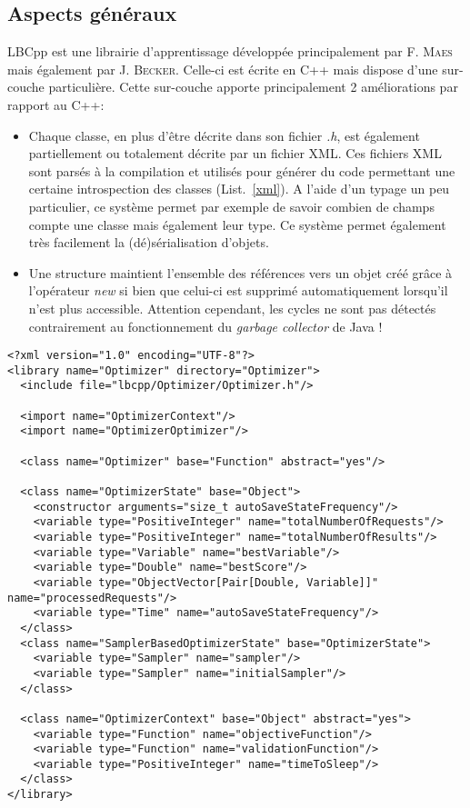 \documentclass[a4paper, 12pt]{report}
\begin{document}
\subsection{Aspects généraux}
LBCpp est une librairie d'apprentissage développée principalement par F. \textsc{Maes} mais également par J. \textsc{Becker}. Celle-ci est écrite en C++ mais dispose d'une sur-couche particulière. Cette sur-couche apporte principalement 2 améliorations par rapport au C++:
\begin{itemize}
\item Chaque classe, en plus d'être décrite dans son fichier \textit{.h}, est également partiellement ou totalement décrite par un fichier XML. Ces fichiers XML sont parsés à la compilation et utilisés pour générer du code permettant une certaine introspection des classes (List.~\ref{xml}). A l'aide d'un typage un peu particulier, ce système permet par exemple de savoir combien de champs compte une classe mais également leur type. Ce système permet également très facilement la (dé)sérialisation d'objets.
\item Une structure maintient l'ensemble des références vers un objet créé grâce à l'opérateur \textit{new} si bien que celui-ci est supprimé automatiquement lorsqu'il n'est plus accessible. Attention cependant, les cycles ne sont pas détectés contrairement au fonctionnement du \textit{garbage collector} de Java !
\end{itemize}
\newpage
{}
\begin{lstlisting}
<?xml version="1.0" encoding="UTF-8"?>
<library name="Optimizer" directory="Optimizer">
  <include file="lbcpp/Optimizer/Optimizer.h"/>

  <import name="OptimizerContext"/>
  <import name="OptimizerOptimizer"/>

  <class name="Optimizer" base="Function" abstract="yes"/>
  
  <class name="OptimizerState" base="Object">
    <constructor arguments="size_t autoSaveStateFrequency"/>
    <variable type="PositiveInteger" name="totalNumberOfRequests"/>
    <variable type="PositiveInteger" name="totalNumberOfResults"/>
    <variable type="Variable" name="bestVariable"/>
    <variable type="Double" name="bestScore"/>
    <variable type="ObjectVector[Pair[Double, Variable]]" name="processedRequests"/>
    <variable type="Time" name="autoSaveStateFrequency"/>
  </class>
  <class name="SamplerBasedOptimizerState" base="OptimizerState">
    <variable type="Sampler" name="sampler"/>
    <variable type="Sampler" name="initialSampler"/>
  </class>

  <class name="OptimizerContext" base="Object" abstract="yes">
    <variable type="Function" name="objectiveFunction"/>
    <variable type="Function" name="validationFunction"/>
    <variable type="PositiveInteger" name="timeToSleep"/>
  </class>
</library>
\end{lstlisting}
\end{document}
